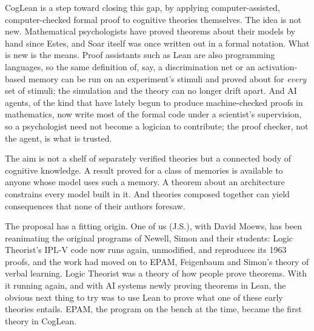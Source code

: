\documentclass[11pt]{article}
\begin{document}
CogLean is a step toward closing this gap, by applying
computer-assisted, computer-checked formal proof to cognitive theories
themselves. The idea is not new. Mathematical psychologists have proved
theorems about their models by hand since Estes\cite{estes1950}, and
Soar itself was once written out in a formal
notation\cite{milnes1992,cooper1996}. What is new is the means. Proof
assistants such as Lean\cite{demoura2021} are also programming
languages, so the same definition of, say, a discrimination net or an
activation-based memory can be run on an experiment's stimuli and
proved about for \emph{every} set of stimuli; the simulation and the
theory can no longer drift apart. And AI agents, of the kind that have
lately begun to produce machine-checked proofs in mathematics, now
write most of the formal code under a scientist's supervision, so a
psychologist need not become a logician to contribute; the proof
checker, not the agent, is what is trusted.

The aim is not a shelf of separately verified theories but a connected
body of cognitive knowledge. A result proved for a class of memories is
available to anyone whose model uses such a memory. A theorem about an
architecture constrains every model built in it. And theories composed
together can yield consequences that none of their authors foresaw.

The proposal has a fitting origin. One of us (J.S.), with
David Moews, has been reanimating the original programs of Newell,
Simon and their students: Logic Theorist's IPL-V code now runs again,
unmodified, and reproduces its 1963 proofs, and the work had moved on
to EPAM, Feigenbaum and Simon's theory of verbal
learning\cite{feigenbaum1962}. Logic Theorist was a theory of how
people prove theorems. With it running again, and with AI systems newly
proving theorems in Lean, the obvious next thing to try was to use Lean
to prove what one of these early theories entails. EPAM, the program on
the bench at the time, became the first theory in CogLean.
\end{document}

